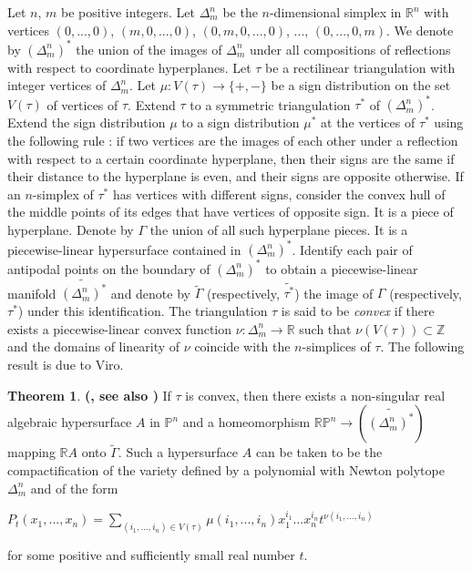 \documentclass[12pt]{article}
\theoremstyle{definition}
\newtheorem{thm}{Theorem}[section]
\begin{document}
\begin{sloppypar}
    Let $n$, $m$ be positive integers. Let $\Delta_m^n$ be the $n$-dimensional simplex in $\mathbb{R}^n$ with vertices $(0,...,0)$, $(m,0,...,0)$, $(0,m,0,...,0)$, ..., $(0,...,0,m)$. We denote by $(\Delta_m^n)^*$ the union of the images of $\Delta_m^n$ under all compositions of reflections with respect to coordinate hyperplanes.
    Let $\tau$ be a rectilinear triangulation with integer vertices of $\Delta_m^n$. Let $\mu: V(\tau) \rightarrow \{ +,- \}$ be a sign distribution on the set $V(\tau)$ of vertices of $\tau$. Extend $\tau$ to a symmetric triangulation $\tau^*$ of $(\Delta_m^n)^*$. 
    Extend the sign distribution $\mu$ to a sign distribution $\mu^*$ at the vertices of $\tau^*$ using the following rule : if two vertices are the images of each other under a reflection with respect to a certain coordinate hyperplane, then their signs are the same if their distance to the hyperplane is even, and their signs are opposite otherwise.
    If an $n$-simplex of $\tau^*$ has vertices with different signs, consider the convex hull of the middle points of its edges that have vertices of opposite sign. It is a piece of hyperplane. Denote by $\Gamma$ the union of all such hyperplane pieces. It is a piecewise-linear hypersurface contained in $(\Delta_m^n)^*$.
    Identify each pair of antipodal points on the boundary of $(\Delta_m^n)^*$ to obtain a piecewise-linear manifold $\widetilde{(\Delta_m^n)^*}$ and denote by $\widetilde{\Gamma}$ (respectively, $\widetilde{\tau^*}$) the image of $\Gamma$ (respectively, $\tau^*$) under this identification.
    The triangulation $\tau$ is said to be \textit{convex} if there exists a piecewise-linear convex function $\nu:\Delta_m^n \rightarrow \mathbb{R}$ such that $\nu(V(\tau)) \subset \mathbb{Z}$ and the domains of linearity of $\nu$ coincide with the $n$-simplices of $\tau$. The following result is due to Viro.
\end{sloppypar}

\begin{thm}
\textbf{(\cite{Vir83}, see also \cite{viropatchwork})} If $\tau$ is convex, then there exists a non-singular real algebraic hypersurface $A$ in $\mathbb{P}^n$ and a homeomorphism $\mathbb{RP}^n \rightarrow (\widetilde{(\Delta_m^n)^*})$ mapping $\mathbb{R}A$ onto $\widetilde{\Gamma}$. Such a hypersurface $A$ can be taken to be the compactification of the variety defined by a polynomial with Newton polytope $\Delta_m^n$ and of the form 
\begin{center}
    $P_t(x_1,...,x_n) = \sum_{(i_1,...,i_n) \in V(\tau)} \mu(i_1,...,i_n)x_1^{i_1}...x_n^{i_n}t^{\nu (i_1,...,i_n)}$    
\end{center}
for some positive and sufficiently small real number $t$.
\end{thm}
\end{document}
